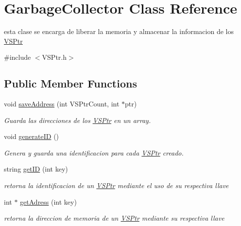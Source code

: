 \hypertarget{classGarbageCollector}{}\section{Garbage\+Collector Class Reference}
\label{classGarbageCollector}


esta clase se encarga de liberar la memoria y almacenar la informacion de los \hyperlink{classVSPtr}{V\+S\+Ptr}  




{\ttfamily \#include $<$V\+S\+Ptr.\+h$>$}

\subsection*{Public Member Functions}
\begin{DoxyCompactItemize}
\item 
void \hyperlink{classGarbageCollector_aabb68414b8f72ca07aeb13ff7cc1d060}{save\+Address} (int V\+S\+Ptr\+Count, int $\ast$ptr)
\begin{DoxyCompactList}\small\item\em Guarda las direcciones de los \hyperlink{classVSPtr}{V\+S\+Ptr} en un array. \end{DoxyCompactList}\item 
\mbox{\label{classGarbageCollector_a22601db30594acef6fbea411f49f3fde}} 
void \hyperlink{classGarbageCollector_a22601db30594acef6fbea411f49f3fde}{generate\+ID} ()
\begin{DoxyCompactList}\small\item\em Genera y guarda una identificacion para cada \hyperlink{classVSPtr}{V\+S\+Ptr} creado. \end{DoxyCompactList}\item 
string \hyperlink{classGarbageCollector_a6bd32127344dabc3b5af12e8ddabace5}{get\+ID} (int key)
\begin{DoxyCompactList}\small\item\em retorna la identificacion de un \hyperlink{classVSPtr}{V\+S\+Ptr} mediante el uso de su respectiva llave \end{DoxyCompactList}\item 
int $\ast$ \hyperlink{classGarbageCollector_acaa683eb8aa51ce85ff5a8e3dbe17bd8}{get\+Adress} (int key)
\begin{DoxyCompactList}\small\item\em retorna la direccion de memoria de un \hyperlink{classVSPtr}{V\+S\+Ptr} mediante su respectiva llave \end{DoxyCompactList}\item 

\end{DoxyCompactItemize}
